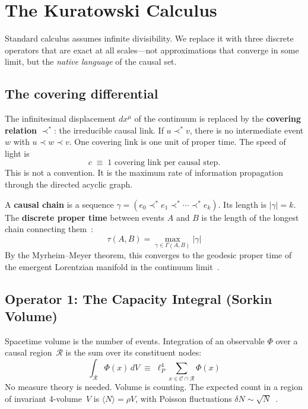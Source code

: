 \documentclass[aps,prd,twocolumn,superscriptaddress,nofootinbib,amsmath,amssymb,longbibliography]{revtex4-2}
\newcommand{\lp}{\ell_P}
\begin{document}
\section{The Kuratowski Calculus}\label{sec:calculus}

Standard calculus assumes infinite divisibility.
We replace it with three discrete operators that are exact at all
scales---not approximations that converge in some limit,
but the \emph{native language} of the causal set.

\subsection{The covering differential}

The infinitesimal displacement $dx^\mu$ of the continuum is replaced by
the \textbf{covering relation} $\prec^*$: the irreducible causal link.
If $u \prec^* v$, there is no intermediate event $w$ with
$u \prec w \prec v$.
One covering link is one unit of proper time.
The speed of light is
\begin{equation}
  c \;\equiv\; \text{1 covering link per causal step.}
\end{equation}
This is not a convention.  It is the maximum rate of information
propagation through the directed acyclic graph.

A \textbf{causal chain} is a sequence
$\gamma = (e_0 \prec^* e_1 \prec^* \cdots \prec^* e_k)$.
Its length is $|\gamma| = k$.
The \textbf{discrete proper time} between events $A$ and $B$ is
the length of the longest chain connecting them~\cite{myrheim1978}:
\begin{equation}\label{eq:proper_time}
  \tau(A,B) = \max_{\gamma \in \Gamma(A,B)} |\gamma|
\end{equation}
By the Myrheim--Meyer theorem, this converges to the geodesic proper
time of the emergent Lorentzian manifold in the continuum
limit~\cite{brightwell1991}.

\subsection{Operator 1: The Capacity Integral (Sorkin Volume)}

Spacetime volume is the number of events.
Integration of an observable $\Phi$ over a causal region~$\mathcal{R}$
is the sum over its constituent nodes:
\begin{equation}\label{eq:capacity}
  \int_{\mathcal{R}} \Phi(x)\,dV
  \;\equiv\; \lp^4 \sum_{x \in \mathcal{C} \cap \mathcal{R}} \Phi(x)
\end{equation}
No measure theory is needed.  Volume is counting.
The expected count in a region of invariant 4-volume~$V$ is
$\langle N \rangle = \rho V$, with Poisson fluctuations
$\delta N \sim \sqrt{N}$~\cite{kingman1993}.
\end{document}
